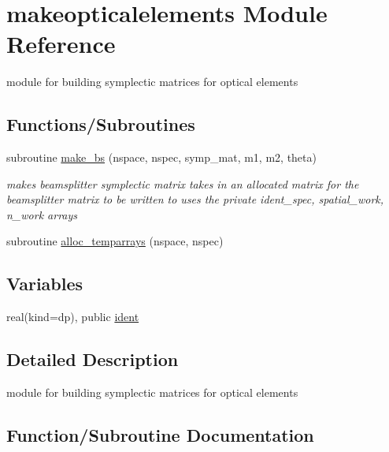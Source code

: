 \hypertarget{namespacemakeopticalelements}{}\section{makeopticalelements Module Reference}
\label{namespacemakeopticalelements}


module for building symplectic matrices for optical elements  


\subsection*{Functions/\+Subroutines}
\begin{DoxyCompactItemize}
\item 
subroutine \hyperlink{namespacemakeopticalelements_a593a6ee34afdeebc8b4667791c8a144f}{make\+\_\+bs} (nspace, nspec, symp\+\_\+mat, m1, m2, theta)
\begin{DoxyCompactList}\small\item\em makes beamsplitter symplectic matrix  takes in an allocated matrix for the beamsplitter matrix to be written to uses the private ident\+\_\+spec, spatial\+\_\+work, n\+\_\+work arrays \end{DoxyCompactList}\item 
subroutine \hyperlink{namespacemakeopticalelements_aefda61530c80eccf75e7065015af413d}{alloc\+\_\+temparrays} (nspace, nspec)
\end{DoxyCompactItemize}
\subsection*{Variables}
\begin{DoxyCompactItemize}
\item 
real(kind=dp), public \hyperlink{namespacemakeopticalelements_ab4e48a98a0fb0756bb4eff6ece9623a8}{ident}
\end{DoxyCompactItemize}


\subsection{Detailed Description}
module for building symplectic matrices for optical elements 

\subsection{Function/\+Subroutine Documentation}
\mbox{\label{namespacemakeopticalelements_aefda61530c80eccf75e7065015af413d}} 
